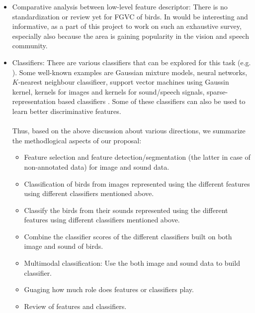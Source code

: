 \documentclass{article}
\begin{document}
\begin{itemize}
\item Comparative analysis between low-level feature descriptor: There is no standardization or review yet for FGVC of birds. In would be interesting and informative, as a part of this project to work on such an exhaustive survey, especially also because the area is gaining popularity in the vision and speech community.
\item Classifiers: There are various classifiers that can be explored for this task (e.g. \cite{duda}). Some well-known examples are Gaussian mixture models, neural networks, $K$-nearest neighbour classifieer, support vector machines using Gaussin kernel, kernels for images and kernels for sound/speech signals, sparse-representation based classifiers \cite{sparse,sparse1}. Some of these classifiers can also be used to learn better discriminative features. \ \\ \ \\
Thus, based on the above discussion about various directions, we summarize the methodlogical aspects of our proposal: 
\begin{itemize}
		\item Feature selection and feature detection/segmentation (the latter in case of non-annotated data) for image and sound data. 
    \item Classification of birds from images represented using the different features using different classifiers mentioned above.  
    \item Classify the birds from their sounds represented using the different features using different classifiers mentioned above. 
    \item Combine the classifier scores of the different classifiers built on both image and sound of birds.
    \item Multimodal classification: Use the both image and sound data to build classifier.
    \item Guaging how much role does features or classifiers play.
    \item Review of features and classifiers.
\end{itemize}
\end{itemize}



\end{document}

